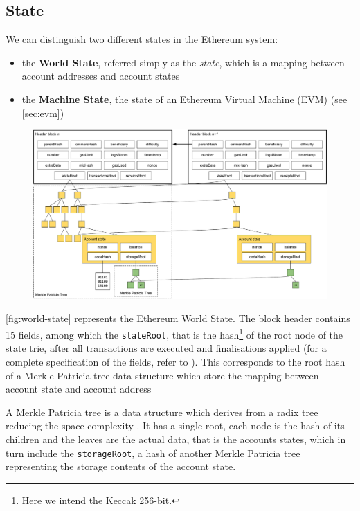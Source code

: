 \subsection{State}

We can distinguish two different states in the Ethereum system:

\begin{itemize}
  \item the \textbf{World State}, referred simply as the \emph{state}, which is
  a mapping between account addresses and account states
  \item the \textbf{Machine State}, the state of an Ethereum Virtual Machine
  (EVM) (see \autoref{sec:evm})
\end{itemize}

\begin{figure}[h]
  \centering
  \includegraphics[width=\textwidth]{./res/img/world-state.pdf}
\label{fig:world-state}
\end{figure}

\autoref{fig:world-state} represents the Ethereum World State. The block header
contains 15 fields, among which the \verb+stateRoot+, that is the
hash\footnote{Here we intend the Keccak 256-bit.} of the root node of the state
trie, after all transactions are executed and finalisations applied (for a
complete specification of the fields, refer to \cite{wood2018ethereum}). This
corresponds to the root hash of a Merkle Patricia tree data structure which
store the mapping between account state and account address

A Merkle Patricia tree is a data structure which derives from a radix tree
reducing the space complexity \cite{patriciatree}. It has a single root, each
node is the hash of its children and the leaves are the actual data, that is the
accounts states, which in turn include the \verb+storageRoot+, a hash of another
Merkle Patricia tree representing the storage contents of the account state.

